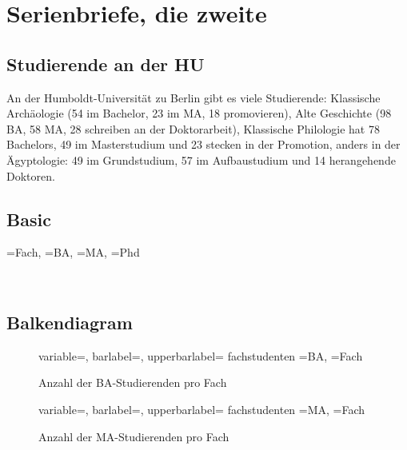 
\chapter{Serienbriefe, die zweite}

\section{Studierende an der HU}

An der Humboldt-Universität zu Berlin gibt es viele Studierende:
Klassische Archäologie (54 im Bachelor, 23 im MA, 18 promovieren), 
Alte Geschichte (98 BA, 58 MA, 28 schreiben an der Doktorarbeit),
Klassische Philologie hat 78 Bachelors, 49 im Masterstudium und 23 stecken in der Promotion,
anders in der Ägyptologie: 49 im Grundstudium, 57 im Aufbaustudium und 14 herangehende Doktoren.

\section{Basic}



{\fach=Fach,%
\ba=BA,%
\ma=MA,%
\phd=Phd%
}%
{\begin{description}
\item[\large\fach]~%
\end{description}}

\section{Balkendiagram}

\begin{figure}
\DTLbarchart%
{variable=\ba,%
barlabel=\fach,%
upperbarlabel=\ba%
}
{fachstudenten}%
{\ba=BA,%
\fach=Fach}
\caption{Anzahl der BA-Studierenden pro Fach}

\end{figure}

\begin{figure}[h]
	\DTLbarchart%
	{variable=\ma,%
		barlabel=\fach,%
		upperbarlabel=\ma%
	}
	{fachstudenten}%
	{\ma=MA,%
		\fach=Fach}
	\caption{Anzahl der MA-Studierenden pro Fach}
	
\end{figure}

